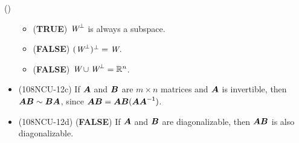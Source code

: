 \begin{theorem}{()}
\begin{itemize}
\begin{itemize}
            \item (\textbf{TRUE}) $\textit{W}^{\bot}$ is always a subspace.
            \item (\textbf{FALSE}) $(\textit{W}^{\bot})^{\bot} = \textit{W}$.
            \item (\textbf{FALSE}) $\textit{W} \cup \textit{W}^\perp = \mathbb{R}^n$.
        \end{itemize}
        \item (108NCU-12c) If $\boldsymbol{A}$ and $\boldsymbol{B}$ are $m \times n$ matrices and $\boldsymbol{A}$ is invertible, then $\boldsymbol{A}\boldsymbol{B} \sim \boldsymbol{B}\boldsymbol{A}$, since $\boldsymbol{A}\boldsymbol{B} = \boldsymbol{A}\boldsymbol{B}(\boldsymbol{A}\boldsymbol{A}^{\mathsf{-1}})$.
        \item (108NCU-12d) (\textbf{FALSE}) If $\boldsymbol{A}$ and $\boldsymbol{B}$ are diagonalizable, then $\boldsymbol{A}\boldsymbol{B}$ is also diagonalizable.
    \end{itemize}
\end{theorem}